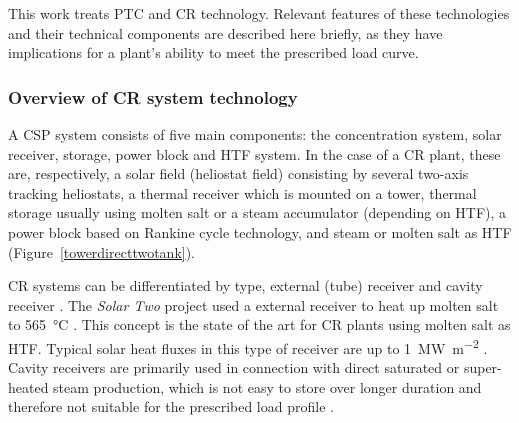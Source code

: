 This work treats \ac{PTC} and \ac{CR} technology. Relevant features of these technologies and their technical components are described here briefly, as they have implications for a plant's ability to meet the prescribed load curve. 

\subsubsection{Overview of CR system technology}

A \ac{CSP} system consists of five main components: the concentration system, solar receiver, storage, power block and \acf{HTF} system. In the case of a \ac{CR} plant, these are, respectively, a solar field (heliostat field) consisting by several two-axis tracking heliostats, a thermal receiver which is mounted on a tower, thermal storage usually using molten salt or a steam accumulator (depending on \ac{HTF}), a power block based on Rankine cycle technology, and steam or molten salt as \ac{HTF} (Figure~\ref{towerdirecttwotank}).


\ac{CR} systems can be differentiated by type, external (tube) receiver and cavity receiver \cite{Hoffschmidt2014}. The \emph{Solar Two} project used a external receiver to heat up molten salt to \SI{565}{\celsius} \cite{Reilly2001}. This concept is the state of the art for CR plants using molten salt as \ac{HTF}. Typical solar heat fluxes in this type of receiver are up to \SI{1}{\mega\watt\per\square\metre} \cite{Pitz-Paal.2013}. Cavity receivers are primarily used in connection with direct saturated or super-heated steam production, which is not easy to store over longer duration and therefore not suitable for the prescribed load profile \cite{Hoffschmidt2014,Steinmann2015}.


